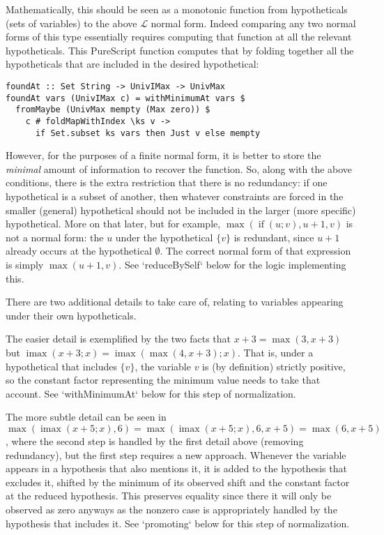 \documentclass[11pt, twoside, reqno]{book}
\DeclareMathOperator{\imax}{imax}
\DeclareMathOperator{\ifop}{if}
\begin{document}
Mathematically, this should be seen as a monotonic function from hypotheticals (sets of variables) to the above \(\mathcal{L}\) normal form.
Indeed comparing any two normal forms of this type essentially requires computing that function at all the relevant hypotheticals.
This PureScript function computes that by folding together all the hypotheticals that are included in the desired hypothetical:
\begin{verbatim}
foundAt :: Set String -> UnivIMax -> UnivMax
foundAt vars (UnivIMax c) = withMinimumAt vars $
  fromMaybe (UnivMax mempty (Max zero)) $
    c # foldMapWithIndex \ks v ->
      if Set.subset ks vars then Just v else mempty
\end{verbatim}

However, for the purposes of a finite normal form, it is better to store the \emph{minimal} amount of information to recover the function.
So, along with the above conditions, there is the extra restriction that there is no redundancy: if one hypothetical is a subset of another, then whatever constraints are forced in the smaller (general) hypothetical should not be included in the larger (more specific) hypothetical.
More on that later, but for example, \(\max(\ifop(u; v), u + 1, v)\) is not a normal form: the \(u\) under the hypothetical \(\{v\}\) is redundant, since \(u + 1\) already occurs at the hypothetical \(\emptyset\).
The correct normal form of that expression is simply \(\max(u+1, v)\).
See \inHS`reduceBySelf` below for the logic implementing this.



There are two additional details to take care of, relating to variables appearing under their own hypotheticals.

The easier detail is exemplified by the two facts that \(x+3 = \max(3, x+3)\) but \(\imax(x+3; x) = \imax(\max(4, x+3); x)\).
That is, under a hypothetical that includes \(\{v\}\), the variable \(v\) is (by definition) strictly positive, so the constant factor representing the minimum value needs to take that account.
See \inHS`withMinimumAt` below for this step of normalization.

The more subtle detail can be seen in \(\max(\imax(x+5; x), 6) = \max(\imax(x+5; x), 6, x+5) = \max(6, x+5)\), where the second step is handled by the first detail above (removing redundancy), but the first step requires a new approach.
Whenever the variable appears in a hypothesis that also mentions it, it is added to the hypothesis that excludes it, shifted by the minimum of its observed shift and the constant factor at the reduced hypothesis.
This preserves equality since there it will only be observed as zero anyways as the nonzero case is appropriately handled by the hypothesis that includes it.
See \inHS`promoting` below for this step of normalization.
\end{document}
